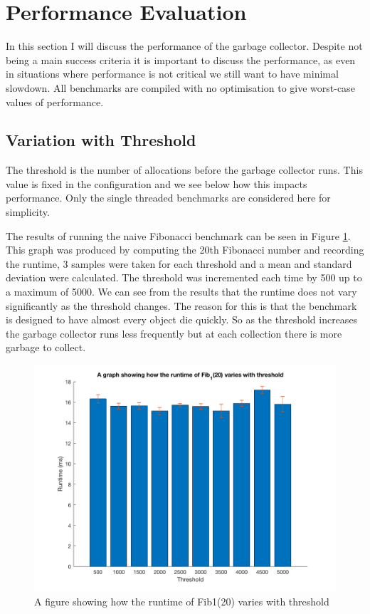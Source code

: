 \documentclass[../diss.tex]{subfiles}
\begin{document}

\section{Performance Evaluation}

In this section I will discuss the performance of the garbage collector. Despite not being a main success criteria it is important to discuss the performance, as even in situations where performance is not critical we still want to have minimal slowdown. All benchmarks are compiled with no optimisation to give worst-case values of performance.

\subsection{Variation with Threshold} \label{sec:variationwiththreshold}

The threshold is the number of allocations before the garbage collector runs. This value is fixed in the configuration and we see below how this impacts performance. Only the single threaded benchmarks are considered here for simplicity. 

The results of running the naive Fibonacci benchmark can be seen in Figure \ref{fig:fib_thresh}. This graph was produced by computing the 20th Fibonacci number and recording the runtime, 3 samples were taken for each threshold and a mean and standard deviation were calculated. The threshold was incremented each time by 500 up to a maximum of 5000. We can see from the results that the runtime does not vary significantly as the threshold changes. The reason for this is that the benchmark is designed to have almost every object die quickly. So as the threshold increases the garbage collector runs less frequently but at each collection there is more garbage to collect.

\begin{figure}
    \centering
    \includegraphics[max width=\linewidth]{figs/fib_threshold.png}
    \caption{A figure showing how the runtime of Fib1(20) varies with threshold}
    \label{fig:fib_thresh}
\end{figure}
\end{document}
